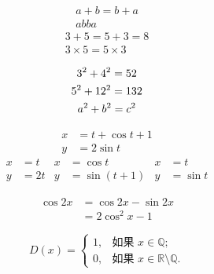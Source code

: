 \documentclass{ctexart}
\begin{document}
    \begin{gather}
        a+b=b+a \\
        ab ba
    \end{gather}
    \begin{gather*}
        3+5=5+3=8 \\
        3 \times 5=5 \times 3
    \end{gather*}

    \begin{gather}
        3^2+4^2=52 \notag \\
        5^2+12^2=132 \notag \\
        a^2+b^2=c^2
    \end{gather}

    \begin{align}
        x &= t + \cos t + 1 \\
        y &= 2 \sin t
    \end{align}
    \begin{align*}
        x &= t & x &= \cos t & x &= t \\
        y &= 2t & y &= \sin(t+1) & y &= \sin t
    \end{align*}

    \begin{equation}
        \begin{split}
            \cos 2x &= \cos 2x - \sin 2x \\
            &= 2 \cos^2 x-1
        \end{split}
    \end{equation}

    \begin{equation}
        D(x)= \begin{cases}
        1, & \text{如果 } x \in \mathbb{Q}; \\
        0, & \text{如果 } x \in \mathbb{R}\setminus\mathbb{Q}.
        \end{cases}
    \end{equation}
\end{document}
